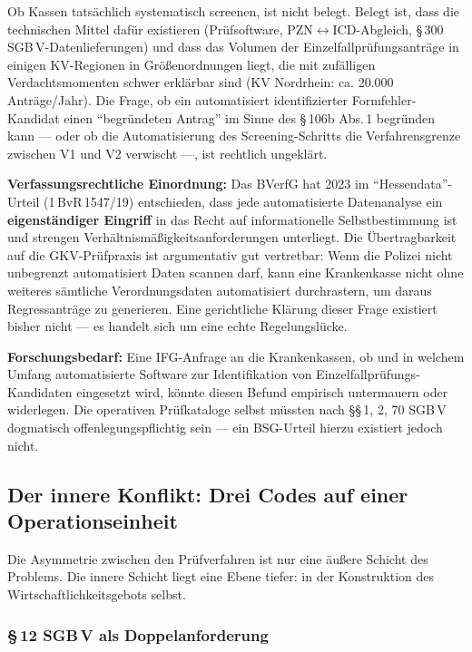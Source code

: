 \documentclass{umbruch-position}
\begin{document}
\medskip

Ob Kassen tatsächlich systematisch screenen, ist nicht belegt. Belegt ist, dass die technischen Mittel dafür existieren (Prüfsoftware, PZN$\leftrightarrow$ICD-Abgleich, \S\,300 SGB\,V-Datenlieferungen) und dass das Volumen der Einzelfallprüfungsanträge in einigen KV-Regionen in Größenordnungen liegt, die mit zufälligen Verdachtsmomenten schwer erklärbar sind (KV Nordrhein: ca. 20.000 Anträge/Jahr). Die Frage, ob ein automatisiert identifizierter Formfehler-Kandidat einen ``begründeten Antrag'' im Sinne des \S\,106b Abs.\,1 begründen kann --- oder ob die Automatisierung des Screening-Schritts die Verfahrensgrenze zwischen V1 und V2 verwischt ---, ist rechtlich ungeklärt.

\begin{sloppypar}
\textbf{Verfassungsrechtliche Einordnung:} Das BVerfG hat 2023 im ``Hessendata''-Urteil (1\,BvR\,1547/19) entschieden, dass jede automatisierte Datenanalyse ein \textbf{eigenständiger Eingriff} in das Recht auf informationelle Selbstbestimmung ist und strengen Verhältnismäßigkeitsanforderungen unterliegt. Die Übertragbarkeit auf die GKV-Prüfpraxis ist argumentativ gut vertretbar: Wenn die Polizei nicht unbegrenzt automatisiert Daten scannen darf, kann eine Krankenkasse nicht ohne weiteres sämtliche Verordnungsdaten automatisiert durchrastern, um daraus Regressanträge zu generieren. Eine gerichtliche Klärung dieser Frage existiert bisher nicht --- es handelt sich um eine echte Regelungslücke.
\end{sloppypar}

\textbf{Forschungsbedarf:} Eine IFG-Anfrage an die Krankenkassen, ob und in welchem Umfang automatisierte Software zur Identifikation von Einzelfallprüfungs-Kandidaten eingesetzt wird, könnte diesen Befund empirisch untermauern oder widerlegen. Die operativen Prüfkataloge selbst müssten nach \S\S\,1, 2, 70 SGB\,V dogmatisch offenlegungspflichtig sein --- ein BSG-Urteil hierzu existiert jedoch nicht.

\subsection{Der innere Konflikt: Drei Codes auf einer Operationseinheit}

Die Asymmetrie zwischen den Prüfverfahren ist nur eine äußere Schicht des Problems. Die innere Schicht liegt eine Ebene tiefer: in der Konstruktion des Wirtschaftlichkeitsgebots selbst.

\subsubsection{\S\,12 SGB\,V als Doppelanforderung}
\end{document}
